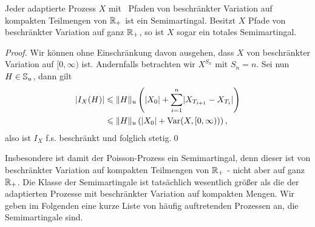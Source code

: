 \begin{prop}
\label{prop:2.4}
 Jeder adaptierte Prozess $X$ mit \cadlag\ Pfaden von
 beschränkter Variation auf kompakten Teilmengen von $\R_+$ 
 ist ein Semimartingal. Besitzt $X$ Pfade von beschränkter Variation
 auf ganz $\R_+$, so ist $X$ sogar ein totales Semimartingal.\fish
\end{prop}

\begin{proof}
Wir können ohne Einschränkung davon ausgehen, dass $X$ von beschränkter
Variation auf $[0,\infty)$ ist. Andernfalls betrachten wir $X^{S_n}$ mit $S_n =
n$. Sei nun $H\in \S_u$, dann gilt
\begin{align*}
\abs{I_X(H)} &\le \norm{H}_u\left(\abs{X_0} + \sum_{i=1}^n
\abs{X_{T_{i+1}}-X_{T_i}}\right)\\
&\le \norm{H}_u\left(\abs{X_0} + \mathrm{Var}(X,[0,\infty))\right),
\end{align*}
also ist $I_X$ f.s. beschränkt und folglich stetig.\qed
\end{proof}

Insbesondere ist damit der Poisson-Prozess ein Semimartingal, denn dieser ist
von beschränkter Variation auf kompakten Teilmengen von $\R_+$ - nicht aber auf
ganz $\R_+$.
Die Klasse der Semimartingale ist tatsächlich wesentlich größer als die der
adaptierten Prozesse mit beschränkter Variation auf kompakten Mengen.
Wir geben im Folgenden eine kurze Liste von häufig auftretenden Prozessen an,
die Semimartingale sind.

